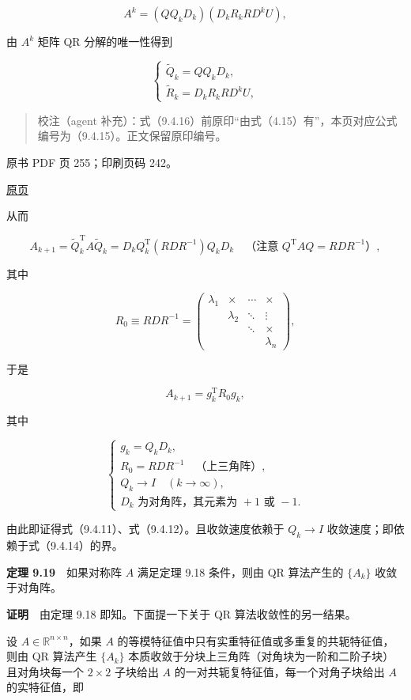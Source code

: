 \[
A^k=(QQ_kD_k)(D_kR_kRD^kU),
\]

由 \(A^k\) 矩阵 QR 分解的唯一性得到

\[
\begin{cases}
\widetilde Q_k=QQ_kD_k,\\
\widetilde R_k=D_kR_kRD^kU,
\end{cases}
\tag{9.4.17}
\]

\begin{quote}
校注（agent 补充）：式（9.4.16）前原印``由式（4.15）有''，本页对应公式编号为（9.4.15）。正文保留原印编号。
\end{quote}

\clearpage

原书 PDF 页 255；印刷页码 242。

\href{source-images/pdf-255.jpeg}{原页}

从而

\[
A_{k+1}=\widetilde Q_k^{\mathrm T}A\widetilde Q_k
=D_kQ_k^{\mathrm T}(RDR^{-1})Q_kD_k
\quad\text{（注意 }Q^{\mathrm T}AQ=RDR^{-1}\text{）},
\]

其中

\[
R_0\equiv RDR^{-1}=\begin{pmatrix}
\lambda_1&\times&\cdots&\times\\
&\lambda_2&\ddots&\vdots\\
&&\ddots&\times\\
&&&\lambda_n
\end{pmatrix},
\]

于是

\[
A_{k+1}=g_k^{\mathrm T}R_0g_k,
\]

其中

\[
\begin{cases}
g_k=Q_kD_k,\\
R_0=RDR^{-1}\quad\text{（上三角阵）},\\
Q_k\to I\quad(k\to\infty),\\
D_k\text{ 为对角阵，其元素为 }+1\text{ 或 }-1.
\end{cases}
\]

由此即证得式（9.4.11）、式（9.4.12）。且收敛速度依赖于 \(Q_k\to I\) 收敛速度；即依赖于式（9.4.14）的界。

\textbf{定理 9.19}　如果对称阵 \(A\) 满足定理 9.18 条件，则由 QR 算法产生的 \(\{A_k\}\) 收敛于对角阵。

\textbf{证明}　由定理 9.18 即知。下面提一下关于 QR 算法收敛性的另一结果。

设 \(A\in\mathbb R^{n\times n}\)，如果 \(A\) 的等模特征值中只有实重特征值或多重复的共轭特征值，则由 QR 算法产生 \(\{A_k\}\) 本质收敛于分块上三角阵（对角块为一阶和二阶子块）且对角块每一个 \(2\times2\) 子块给出 \(A\) 的一对共轭复特征值，每一个对角子块给出 \(A\) 的实特征值，即

